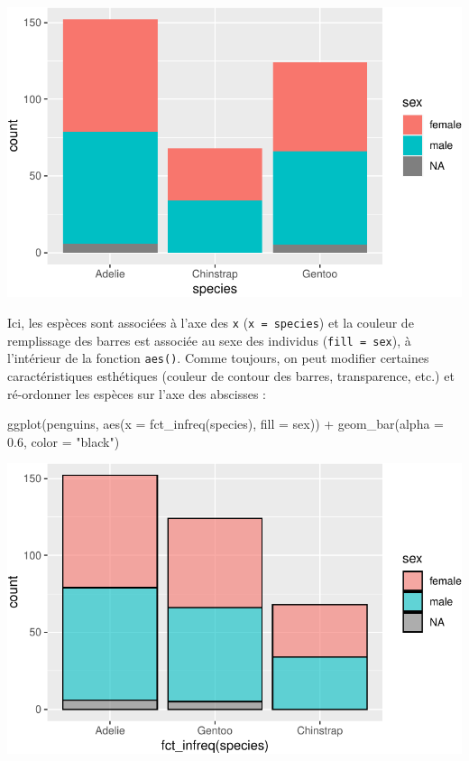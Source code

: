 \documentclass[
  a4paper,
  DIV=11,
  numbers=noendperiod,
  oneside]{scrreprt}
\newenvironment{Shaded}{}{}
\newcommand{\AttributeTok}[1]{\textcolor[rgb]{0.84,0.23,0.29}{#1}}
\newcommand{\FloatTok}[1]{\textcolor[rgb]{0.00,0.36,0.77}{#1}}
\newcommand{\FunctionTok}[1]{\textcolor[rgb]{0.44,0.26,0.76}{#1}}
\newcommand{\NormalTok}[1]{\textcolor[rgb]{0.14,0.16,0.18}{#1}}
\newcommand{\SpecialCharTok}[1]{\textcolor[rgb]{0.00,0.36,0.77}{#1}}
\newcommand{\StringTok}[1]{\textcolor[rgb]{0.01,0.18,0.38}{#1}}
\begin{document}
\includegraphics{03-visualization_files/figure-pdf/unnamed-chunk-54-1.pdf}

Ici, les espèces sont associées à l'axe des \texttt{x}
(\texttt{x\ =\ species}) et la couleur de remplissage des barres est
associée au sexe des individus (\texttt{fill\ =\ sex}), à l'intérieur de
la fonction \texttt{aes()}. Comme toujours, on peut modifier certaines
caractéristiques esthétiques (couleur de contour des barres,
transparence, etc.) et ré-ordonner les espèces sur l'axe des abscisses :

\begin{Shaded}
\begin{Highlighting}[]
\FunctionTok{ggplot}\NormalTok{(penguins, }\FunctionTok{aes}\NormalTok{(}\AttributeTok{x =} \FunctionTok{fct\_infreq}\NormalTok{(species), }\AttributeTok{fill =}\NormalTok{ sex)) }\SpecialCharTok{+}
  \FunctionTok{geom\_bar}\NormalTok{(}\AttributeTok{alpha =} \FloatTok{0.6}\NormalTok{, }\AttributeTok{color =} \StringTok{"black"}\NormalTok{)}
\end{Highlighting}
\end{Shaded}

\includegraphics{03-visualization_files/figure-pdf/unnamed-chunk-55-1.pdf}
\end{document}
